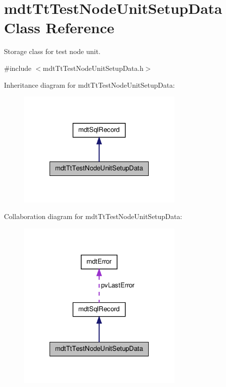 \hypertarget{classmdt_tt_test_node_unit_setup_data}{\section{mdt\-Tt\-Test\-Node\-Unit\-Setup\-Data Class Reference}
\label{classmdt_tt_test_node_unit_setup_data}
}


Storage class for test node unit.  




{\ttfamily \#include $<$mdt\-Tt\-Test\-Node\-Unit\-Setup\-Data.\-h$>$}



Inheritance diagram for mdt\-Tt\-Test\-Node\-Unit\-Setup\-Data\-:
\nopagebreak
\begin{figure}[H]
\begin{center}
\leavevmode
\includegraphics[width=228pt]{classmdt_tt_test_node_unit_setup_data__inherit__graph}
\end{center}
\end{figure}


Collaboration diagram for mdt\-Tt\-Test\-Node\-Unit\-Setup\-Data\-:
\nopagebreak
\begin{figure}[H]
\begin{center}
\leavevmode
\includegraphics[width=228pt]{classmdt_tt_test_node_unit_setup_data__coll__graph}
\end{center}
\end{figure}
